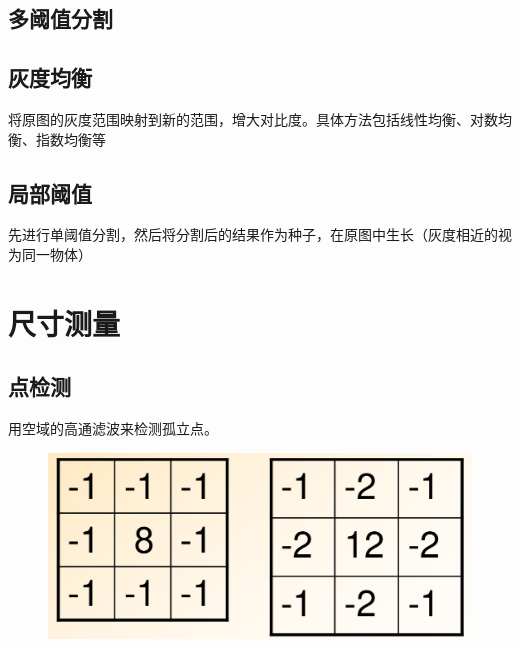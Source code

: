 \documentclass[11pt]{article}
\begin{document}
\subsection{多阈值分割}

\subsection{灰度均衡}
将原图的灰度范围映射到新的范围，增大对比度。具体方法包括线性均衡、对数均衡、指数均衡等

\subsection{局部阈值}
先进行单阈值分割，然后将分割后的结果作为种子，在原图中生长（灰度相近的视为同一物体）


\section{尺寸测量}

\subsection{点检测}
用空域的高通滤波来检测孤立点。
\begin{figure}[htb]
    \centering
    \includegraphics[scale=0.1]{imgs/dot_det.png}
\end{figure}
\end{document}
